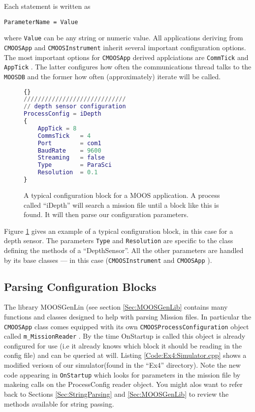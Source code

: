 \documentclass[a4paper,10pt]{article}
\newcommand{\Code}[1]{\texttt{#1} }
\newcommand{\code}[1]{\Code{#1} }
\begin{document}
Each statement is written as
\begin{center}
\code{ParameterName = Value}
\end{center}
where \code{Value} can be any string or numeric value. All
applications deriving from \code{CMOOSApp} and
\code{CMOOSInstrument} inherit several important configuration
options. The most important options for \code{CMOOSApp} derived applciations
are  \code{CommTick} and \code{AppTick}. The latter configures how often the
communications thread talks to the \code{MOOSDB} and the former how often (approximately)
iterate will be called.


\begin{figure}\label{fig:ProcConfig}
\caption{A typical configuration block for a MOOS application. A
process called ``iDepth'' will search a mission file until a block
like this is found. It will then parse our configuration
parameters.}
\begin{lstlisting}[language = {matlab}]{}
/////////////////////////////
// depth sensor configuration
ProcessConfig = iDepth
{
    AppTick = 8
    CommsTick   = 4
    Port        = com1
    BaudRate    = 9600
    Streaming   = false
    Type        = ParaSci
    Resolution  = 0.1
}
\end{lstlisting}
\end{figure}
Figure \ref{fig:ProcConfig} gives an example of a typical
configuration block, in this case for a depth sensor. The
parameters \code{Type} and \code{Resolution} are specific to the
class defining the methods of a ``DepthSensor''. All the other
parameters are handled by its base classes
--- in this case (\code{CMOOSInstrument} and \code{CMOOSApp}).

\subsection{Parsing Configuration Blocks}

The library MOOSGenLin (see section \ref{Sec:MOOSGenLib} contains many functions and classes
designed to help with parsing Mission files. In particular the \code{CMOOSApp} class comes equipped with its own
\code{CMOOSProcessConfiguration} object called \code{m\_MissionReader}. By the time OnStartup is called this object is already configured for use (i.e it already knows which block it should be reading in the config file) and can be queried at will.
Listing \ref{Code:Ex4:Simulator.cpp} shows a modified veriosn of our simulator(found in the ``Ex4'' directory). Note the new code appearing in \code{OnStartup} which looks for parameters in the mission file by makeing calls on the ProcessConfig reader object. You might alos want to refer back to Sections \ref{Sec:StringParsing} and  \ref{Sec:MOOSGenLib}  to review the methods available for string passing.
\end{document}
